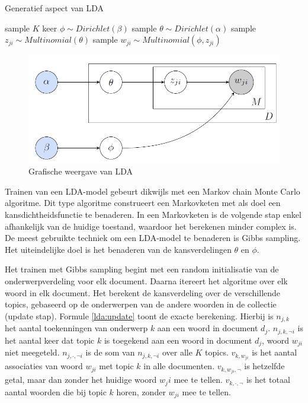 \begin{algorithm}
\caption{Generatief aspect van LDA}
\begin{algorithmic} 
\STATE sample $K$ keer  $\phi \sim Dirichlet(\beta)$
\STATE sample $\theta \sim Dirichlet(\alpha)$
\STATE sample $z_{ji} \sim Multinomial(\theta)$
\STATE sample $w_{ji} \sim Multinomial(\phi,z_{ji})$
\ENDFOR
\ENDFOR
\end{algorithmic}
\label{algo:lda}
\end{algorithm}

\begin{figure}[tb]
    \centering
    \includegraphics[width=\linewidth]{Images/lda.png}
    \caption{Grafische weergave van LDA}
    \label{fig:lda}
\end{figure}

Trainen van een LDA-model gebeurt dikwijls met een Markov chain Monte Carlo algoritme. Dit type algoritme construeert een Markovketen met als doel een kansdichtheidsfunctie te benaderen. In een Markovketen is de volgende stap enkel afhankelijk van de huidige toestand, waardoor het berekenen minder complex is. De meest gebruikte techniek om een LDA-model te benaderen is Gibbs sampling. Het uiteindelijke doel is het benaderen van de kansverdelingen $\theta$ en $\phi$.


Het trainen met Gibbs sampling begint met een random initialisatie van de onderwerpverdeling voor elk document. Daarna itereert het algoritme over elk woord in elk document. Het berekent de kansverdeling over de verschillende topics, gebaseerd op de onderwerpen van de andere woorden in de collectie (update stap). Formule \eqref{lda:update} toont de exacte berekening. Hierbij is $n_{j,k}$ het aantal toekenningen van onderwerp $k$ aan een woord in document $d_j$. $n_{j,k,\neg i}$ is het aantal keer dat topic $k$ is toegekend aan een woord in document $d_j$, woord $w_{ji}$ niet meegeteld. $n_{j,\cdot,\neg i}$ is de som van $n_{j,k,\neg i}$ over alle $K$ topics. $v_{k,w_{ji}}$ is het aantal associaties van woord $w_{ji}$ met topic $k$ in alle documenten. $v_{k,w_{ji}, \neg}$ is hetzelfde getal, maar dan zonder het huidige woord $w_ji$ mee te tellen. $v_{k,\cdot,\neg}$ is het totaal aantal woorden die bij topic $k$ horen, zonder $w_{ji}$ mee te tellen.

